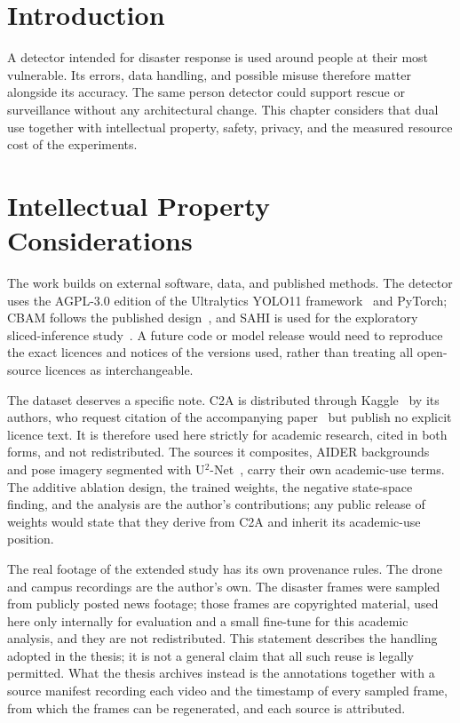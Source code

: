 \documentclass[12pt,a4paper,oneside]{report}
\begin{document}
\section{Introduction}
A detector intended for disaster response is used around people at their most
vulnerable. Its errors, data handling, and possible misuse therefore matter
alongside its accuracy. The same person detector could support rescue or
surveillance without any architectural change. This chapter considers that
dual use together with intellectual property, safety, privacy, and the measured
resource cost of the experiments.

\section{Intellectual Property Considerations}
The work builds on external software, data, and published methods. The detector
uses the AGPL-3.0 edition of the Ultralytics YOLO11
framework~\cite{jocher2024yolo11} and PyTorch; CBAM
follows the published design~\cite{woo2018cbam}, and SAHI is used for the
exploratory sliced-inference study~\cite{akyon2022sahi}. A future code or model
release would need to reproduce the exact licences and notices of the versions
used, rather than treating all open-source licences as interchangeable.

The dataset deserves a specific note. C2A is distributed through
Kaggle~\cite{c2akaggle} by its authors, who request citation of the
accompanying paper~\cite{nihal2024c2a} but publish no explicit licence text.
It is therefore used here strictly for academic research, cited in both
forms, and not redistributed. The sources it composites, AIDER
backgrounds~\cite{kyrkou2020aider} and pose imagery segmented with
U$^2$-Net~\cite{qin2020u2net}, carry their own academic-use terms. The
additive ablation design, the trained weights, the negative state-space
finding, and the analysis are the author's contributions; any public release
of weights would state that they derive from C2A and inherit its
academic-use position.

The real footage of the extended study has its own provenance rules. The
drone and campus recordings are the author's own. The disaster frames were
sampled from publicly posted news footage; those frames are copyrighted
material, used here only internally for evaluation and a small fine-tune
for this academic analysis, and they are not redistributed. This statement
describes the handling adopted in the thesis; it is not a general claim that
all such reuse is legally permitted. What the
thesis archives instead is the annotations together with a source manifest
recording each video and the timestamp of every sampled frame, from which
the frames can be regenerated, and each source is attributed.
\end{document}
